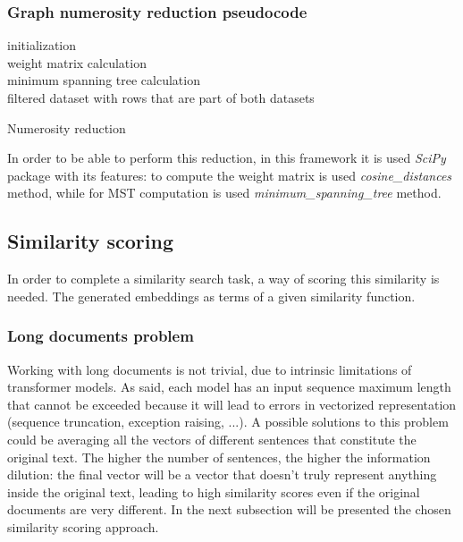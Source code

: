 \documentclass[\main/main.tex]{subfiles}
\begin{document}
\subsubsection{Graph numerosity reduction pseudocode}
\begin{center}
    \begin{algorithm}[H]
     initialization\\
     weight matrix calculation\\
     minimum spanning tree calculation\\
     \Return filtered dataset with rows that are part of both datasets
     \caption{Numerosity reduction}
    \end{algorithm}
\end{center}
In order to be able to perform this reduction, in this framework it is used \emph{SciPy} \cite{2020SciPyNMeth} package with its features: to compute the weight matrix is used \emph{cosine\_distances} method, while for MST computation is used \emph{minimum\_spanning\_tree} method.
\subsection{Similarity scoring}
In order to complete a similarity search task, a way of scoring this similarity is needed. The generated embeddings as terms of a given similarity function. 
\subsubsection{Long documents problem}
Working with long documents is not trivial, due to intrinsic limitations of transformer models. As said, each model has an input sequence maximum length that cannot be exceeded because it will lead to errors in vectorized representation (sequence truncation, exception raising, ...). A possible solutions to this problem could be averaging all the vectors of different sentences that constitute the original text. The higher the number of sentences, the higher the information dilution: the final vector will be a vector that doesn't truly represent anything inside the original text, leading to high similarity scores even if the original documents are very different. In the next subsection will be presented the chosen similarity scoring approach.
\end{document}
